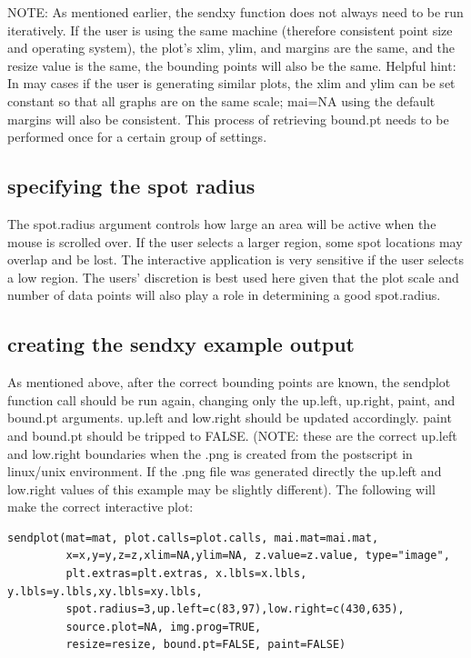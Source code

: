 \documentclass[]{article}
\begin{document}
NOTE: As mentioned earlier, the sendxy function does not always need to be run iteratively. If the user is using the same machine (therefore consistent point size and operating system), the plot's xlim, ylim, and margins are the same, and the resize value is the same, the bounding points will also be the same. Helpful hint:  In may cases if the user is generating similar plots, the xlim and ylim can be set constant so that all graphs are on the same scale; mai=NA using the default margins will also be consistent. This process of retrieving bound.pt needs to be performed once for a certain group of settings.\newline
\\


\subsection{specifying the spot radius}

\indent The spot.radius argument controls how large an area will be active when the mouse is scrolled over. If the user selects a larger region, some spot locations may overlap and be lost. The interactive application is very sensitive if the user selects a low region. The users' discretion is best used here given that the plot scale and number of data points will also play a role in determining a good spot.radius.  \\


\subsection{creating the sendxy example output}

\indent As mentioned above, after the correct bounding points are known, the sendplot function call should be run again, changing only the up.left, up.right, paint, and bound.pt arguments. up.left and low.right should be updated accordingly. paint and bound.pt should be tripped to FALSE. (NOTE: these are the correct up.left and low.right boundaries when the .png is created from the postscript in linux/unix environment. If the .png file was generated directly the up.left and low.right values of this example may be slightly different).  The following will make the correct interactive plot:

\begin{verbatim}
sendplot(mat=mat, plot.calls=plot.calls, mai.mat=mai.mat,
         x=x,y=y,z=z,xlim=NA,ylim=NA, z.value=z.value, type="image",
         plt.extras=plt.extras, x.lbls=x.lbls, y.lbls=y.lbls,xy.lbls=xy.lbls, 
         spot.radius=3,up.left=c(83,97),low.right=c(430,635),
         source.plot=NA, img.prog=TRUE,
         resize=resize, bound.pt=FALSE, paint=FALSE)

\end{verbatim}
\end{document}
